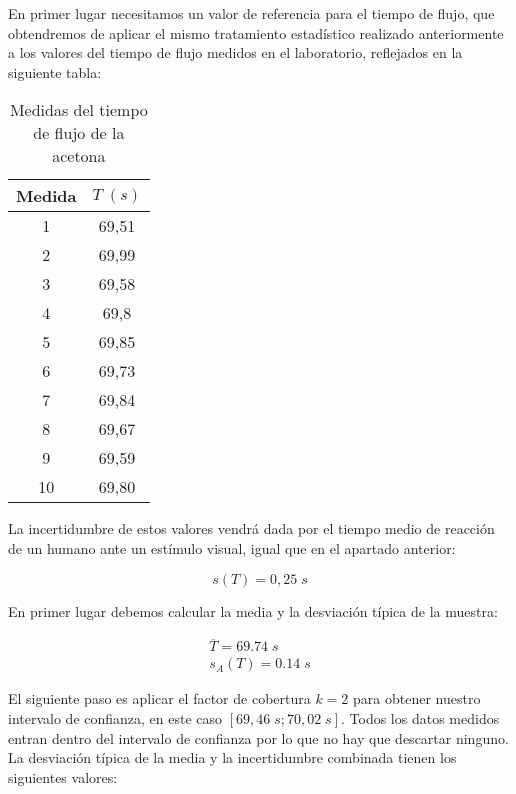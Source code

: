 \documentclass[a4paper,12pt,titlepage]{article}
\begin{document}
\par En primer lugar necesitamos un valor de referencia para el tiempo de flujo, que obtendremos de aplicar el mismo tratamiento estadístico realizado anteriormente a los valores del tiempo de flujo medidos en el laboratorio, reflejados en la siguiente tabla:

\begin{table}[h!]
    \centering
    \begin{tabular}{|c|c|}
    \hline
    Medida   & $T \; (s)$ \\ \hline
    1  & 69,51 \\ \hline
    2  & 69,99 \\ \hline
    3  & 69,58 \\ \hline
    4  & 69,8  \\ \hline
    5  & 69,85 \\ \hline
    6  & 69,73 \\ \hline
    7  & 69,84 \\ \hline
    8  & 69,67 \\ \hline
    9  & 69,59 \\ \hline
    10 & 69,80  \\ \hline
    \end{tabular}
    \caption{Medidas del tiempo de flujo de la acetona}
    \label{T acetona}
\end{table}

La incertidumbre de estos valores vendrá dada por el tiempo medio de reacción de un humano ante un estímulo visual, igual que en el apartado anterior:

\begin{equation}
    s(T) = 0,25 \; s
\end{equation}

En primer lugar debemos calcular la media y la desviación típica de la muestra:

\begin{equation}
    \begin{gathered}
        \overline{T} = 69.74 \;s\\
        s_A(T) = 0.14 \;s
    \end{gathered}
\end{equation}

El siguiente paso es aplicar el factor de cobertura $k=2$ para obtener nuestro intervalo de confianza, en este caso $[69,46\; s;70,02\; s]$. Todos los datos medidos entran dentro del intervalo de confianza por lo que no hay que descartar ninguno. La desviación típica de la media y la incertidumbre combinada tienen los siguientes valores:
\end{document}
